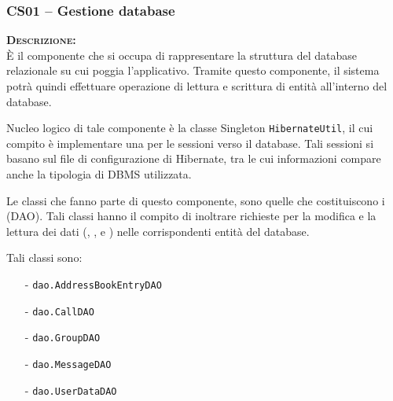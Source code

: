 \subsubsection{CS01 -- Gestione database}\label{sec:cs01}
\begin{description}
\item{\scshape\bfseries Descrizione:}\\
È il componente che si occupa di rappresentare la struttura del database relazionale su cui poggia l'applicativo. Tramite questo componente, il sistema potrà quindi effettuare operazione di lettura e scrittura di entità all'interno del database.

Nucleo logico di tale componente è la classe Singleton \texttt{HibernateUtil}, il cui compito è implementare una  per le sessioni verso il database. Tali sessioni si basano sul file di configurazione di Hibernate, tra le cui informazioni compare anche la tipologia di DBMS utilizzata.

Le classi che fanno parte  di questo componente, sono quelle che costituiscono i  (DAO). Tali classi hanno il compito di inoltrare richieste per la modifica e la lettura dei dati (, ,  e ) nelle corrispondenti entità del database.
	
	Tali classi sono:
	\begin{itemize}
	  \item[-] \texttt{dao.AddressBookEntryDAO}
		\item[-] \texttt{dao.CallDAO}
		\item[-] \texttt{dao.GroupDAO}
		\item[-] \texttt{dao.MessageDAO}
		\item[-] \texttt{dao.UserDataDAO}
	\end{itemize}


\end{description}
